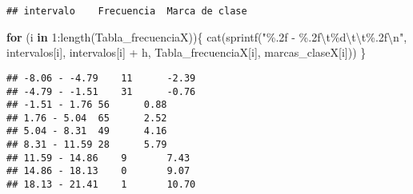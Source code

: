 \documentclass[
]{article}
\newenvironment{Shaded}{\begin{snugshade}}{\end{snugshade}}
\newcommand{\ControlFlowTok}[1]{\textcolor[rgb]{0.13,0.29,0.53}{\textbf{#1}}}
\newcommand{\DecValTok}[1]{\textcolor[rgb]{0.00,0.00,0.81}{#1}}
\newcommand{\FunctionTok}[1]{\textcolor[rgb]{0.00,0.00,0.00}{#1}}
\newcommand{\NormalTok}[1]{#1}
\newcommand{\SpecialCharTok}[1]{\textcolor[rgb]{0.00,0.00,0.00}{#1}}
\newcommand{\StringTok}[1]{\textcolor[rgb]{0.31,0.60,0.02}{#1}}
\begin{document}
\begin{verbatim}
## intervalo    Frecuencia  Marca de clase
\end{verbatim}

\begin{Shaded}
\begin{Highlighting}[]
\ControlFlowTok{for}\NormalTok{ (i }\ControlFlowTok{in} \DecValTok{1}\SpecialCharTok{:}\FunctionTok{length}\NormalTok{(Tabla\_frecuenciaX))\{}
  \FunctionTok{cat}\NormalTok{(}\FunctionTok{sprintf}\NormalTok{(}\StringTok{"\%.2f {-} \%.2f}\SpecialCharTok{\textbackslash{}t}\StringTok{\%d}\SpecialCharTok{\textbackslash{}t\textbackslash{}t}\StringTok{\%.2f}\SpecialCharTok{\textbackslash{}n}\StringTok{"}\NormalTok{, intervalos[i], intervalos[i] }\SpecialCharTok{+}\NormalTok{ h, Tabla\_frecuenciaX[i], marcas\_claseX[i]))}
\NormalTok{\}}
\end{Highlighting}
\end{Shaded}

\begin{verbatim}
## -8.06 - -4.79    11      -2.39
## -4.79 - -1.51    31      -0.76
## -1.51 - 1.76 56      0.88
## 1.76 - 5.04  65      2.52
## 5.04 - 8.31  49      4.16
## 8.31 - 11.59 28      5.79
## 11.59 - 14.86    9       7.43
## 14.86 - 18.13    0       9.07
## 18.13 - 21.41    1       10.70
\end{verbatim}
\end{document}

